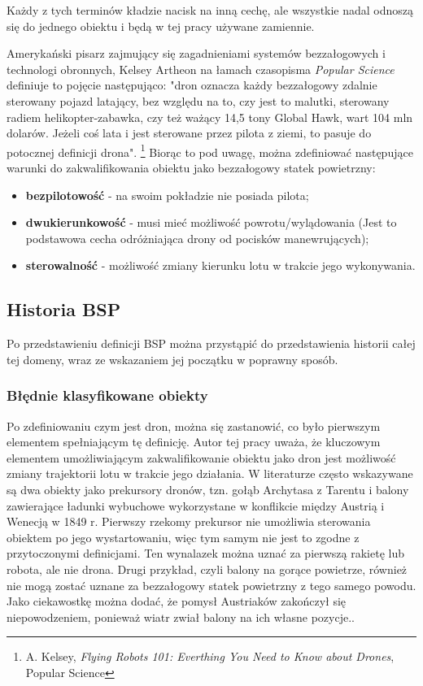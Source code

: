 Każdy z tych terminów kładzie nacisk na inną cechę, ale wszystkie nadal odnoszą się do jednego obiektu i będą w tej pracy używane zamiennie. 

Amerykański pisarz zajmujący się zagadnieniami systemów bezzałogowych i technologi obronnych,  Kelsey Artheon na łamach czasopisma \textit{Popular Science} definiuje to pojęcie następująco: "dron oznacza każdy bezzałogowy zdalnie sterowany pojazd latający, bez względu na to, czy jest to malutki, sterowany radiem helikopter-zabawka, czy też ważący 14,5 tony Global Hawk, wart 104 mln dolarów. Jeżeli coś lata i jest sterowane przez pilota z ziemi, to pasuje do potocznej definicji drona". \footnote{A. Kelsey, \textit{Flying Robots 101: Everthing You Need to Know about Drones}, Popular Science\cite{arton-kelsey}} Biorąc to pod uwagę, można zdefiniować następujące warunki do zakwalifikowania obiektu jako bezzałogowy statek powietrzny:
\begin{itemize}
  \item \textbf{bezpilotowość} - na swoim pokładzie nie posiada pilota;
  \item \textbf{dwukierunkowość} - musi mieć możliwość powrotu/wylądowania (Jest to podstawowa cecha odróżniająca drony od pocisków manewrujących); 
  \item \textbf{sterowalność} - możliwość zmiany kierunku lotu w trakcie jego wykonywania.\\\cite{dron-ibuk}\cite{arton-kelsey}
\end{itemize}

\subsection{Historia BSP}
Po przedstawieniu definicji BSP można przystąpić do przedstawienia historii całej tej domeny, wraz ze wskazaniem jej początku w poprawny sposób.

\subsubsection{Błędnie klasyfikowane obiekty}
Po zdefiniowaniu czym jest dron, można się zastanowić, co było pierwszym elementem spełniającym tę definicję. Autor tej pracy uważa, że kluczowym elementem umożliwiającym zakwalifikowanie obiektu jako dron jest możliwość zmiany trajektorii lotu w trakcie jego działania. W literaturze często wskazywane są dwa obiekty jako prekursory dronów, tzn. gołąb Archytasa z Tarentu i balony zawierające ładunki wybuchowe wykorzystane w konflikcie między Austrią i Wenecją w 1849 r. Pierwszy rzekomy prekursor nie umożliwia sterowania obiektem po jego wystartowaniu, więc tym samym nie jest to zgodne z przytoczonymi definicjami. Ten wynalazek można uznać za pierwszą rakietę lub robota, ale nie drona. Drugi przykład, czyli balony na gorące powietrze, również nie mogą zostać uznane za bezzałogowy statek powietrzny z tego samego powodu. Jako ciekawostkę można dodać, że pomysł Austriaków zakończył się niepowodzeniem, ponieważ wiatr zwiał balony na ich własne pozycje.\cite{dron-ibuk}. 


